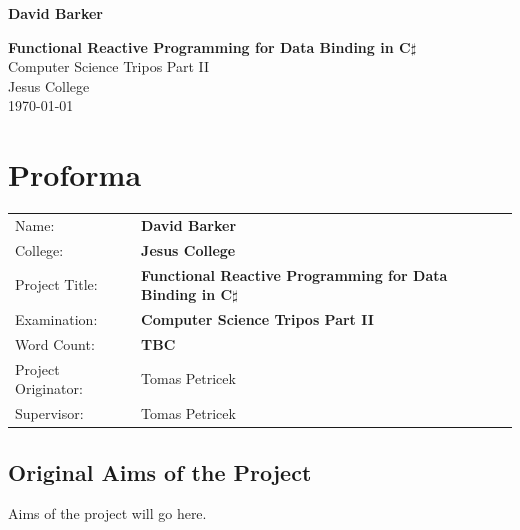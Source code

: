 \documentclass[12pt,twoside,notitlepage]{report}
\begin{document}





\pagestyle{empty}

\hfill{\LARGE \bf David Barker}

\vspace*{60mm}
\begin{center}
\Huge
{\bf Functional Reactive Programming for Data Binding in C$\sharp$} \\
\vspace*{5mm}
Computer Science Tripos Part II \\
\vspace*{5mm}
Jesus College \\
\vspace*{5mm}
\today  %
\end{center}

\cleardoublepage


\setcounter{page}{1}
\pagestyle{plain}

\chapter*{Proforma}

{\large
\begin{tabular}{ll}
Name:               & \bf David Barker \\
College:            & \bf Jesus College \\
Project Title:      & \bf Functional Reactive Programming for Data Binding in C$\sharp$ \\
Examination:        & \bf Computer Science Tripos Part II \\
Word Count:         & \bf TBC \\
Project Originator: & Tomas Petricek \\
Supervisor:         & Tomas Petricek \\
\end{tabular}
}


\section*{Original Aims of the Project}

Aims of the project will go here.
\end{document}
